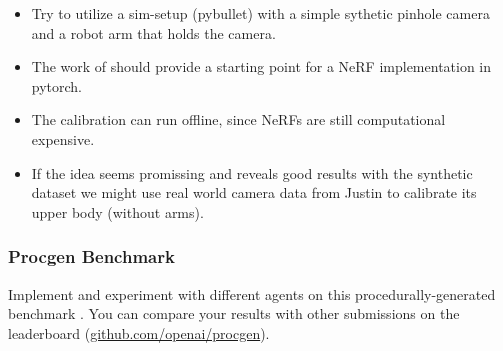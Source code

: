 \documentclass[a4paper]{article}
\begin{document}
\begin{itemize}
  \item Try to utilize a sim-setup (pybullet) with a simple sythetic pinhole camera and a robot arm that holds the camera.
  \item The work of \cite{SCNeRF2021} should provide a starting point for a NeRF implementation in pytorch.
  \item The calibration can run offline, since NeRFs are still computational expensive.
  \item If the idea seems promissing and reveals good results with the synthetic dataset we might use real world camera data from Justin to calibrate its upper body (without arms).
\end{itemize}





\subsubsection{Procgen Benchmark}
Implement and experiment with different agents on this procedurally-generated benchmark \cite{procgen2020}. 
You can compare your results with other submissions on the leaderboard (\url{github.com/openai/procgen}).




\end{document}
